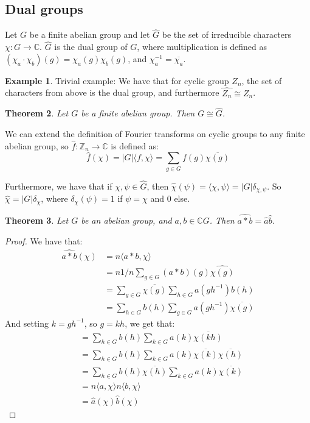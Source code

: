 \documentclass[]{article}
\newtheorem{theorem}{Theorem}
\theoremstyle{definition}
\newtheorem{example}[theorem]{Example}
\numberwithin{theorem}{section}
\numberwithin{equation}{section}
\begin{document}
\subsection{Dual groups}
Let $G$ be a finite abelian group and let $\widehat{G}$ be the set of irreducible characters $\chi: G \rightarrow \mathbb{C}$. $\widehat{G}$ is the dual group of $G$, where multiplication is defined as $(\chi_a \cdot \chi_b)(g) = \chi_a(g)\chi_b(g)$, and $\chi_a^{-1} = \overline{\chi_a}$. 

\begin{example}
	Trivial example: We have that for cyclic group $Z_n$, the set of characters from above is the dual group, and furthermore $\widehat{Z_n} \cong Z_n$. 
\end{example}

\begin{theorem}
	Let $G$ be a finite abelian group. Then $G \cong \widehat{G}$.
\end{theorem}

We can extend the definition of Fourier transforms on cyclic groups to any finite abelian group, so $\widehat{f}: \mathbb{Z}_n \rightarrow \mathbb{C}$ is defined as:
\begin{equation}
	\widehat{f}(\chi) = |G| \langle f, \chi \rangle = \sum_{g \in G} f(g) \overline{\chi(g)}
\end{equation}

Furthermore, we have that if $\chi, \psi \in \widehat{G}$, then $\widehat{\chi}(\psi) = \langle \chi, \psi \rangle = |G|\delta_{\chi, \psi}$. So $\widehat{\chi} = |G| \delta_{\chi}$, where $\delta_{\chi}(\psi) = 1$ if $\psi = \chi$ and 0 else. 

\begin{theorem}
	Let $G$ be an abelian group, and $a, b \in \mathbb{C}G$. Then $ \widehat{a \ast b} = \widehat{a} \widehat{b}$. 
\end{theorem}

\begin{proof}
	We have that:
\begin{align*}
		\widehat{a \ast b}(\chi) &= n \langle a \ast b, \chi \rangle\\
		&= n 1/n \sum_{g \in G} (a \ast b) (g) \widehat{\chi(g)} \\
		&= \sum_{g \in G} \overline{\chi(g)} 
		\sum_{h \in G} a(g h^{-1}) b(h) \\
		&= \sum_{h \in G} b(h)  
		\sum_{g \in G} a(g h^{-1})\overline{\chi(g)}  
\end{align*} 
And setting $k = gh^{-1}$, so $g =kh$, we get that:
\begin{align*}
		&= \sum_{h \in G} b(h)  
		\sum_{k \in G} a(k)\overline{\chi(kh)} \\
		&= \sum_{h \in G} b(h)  
		\sum_{k \in G} a(k)\overline{\chi(k)} \overline{\chi(h)} \\
		&=  \sum_{h \in G} b(h)  \overline{\chi(h)} 
		\sum_{k \in G} a(k)\overline{\chi(k)}\\
		&= n \langle a, \chi \rangle n \langle b, \chi \rangle\\
		&= \widehat{a}(\chi) \widehat{b}(\chi)
\end{align*}
\end{proof}
\end{document}

